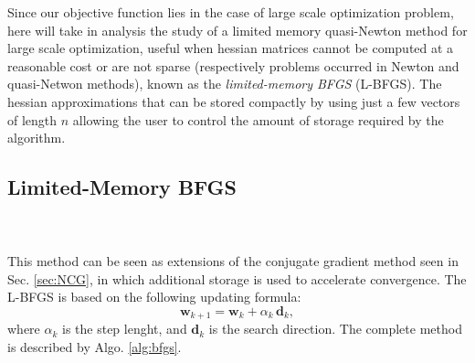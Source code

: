 Since our objective function lies in the case of large scale optimization problem, here will take in analysis the study of a limited memory quasi-Newton method for large scale optimization, useful when hessian matrices cannot be computed at a reasonable cost or are not sparse (respectively problems occurred in Newton and quasi-Netwon methods), known as the \emph{limited-memory BFGS} (L-BFGS). The hessian approximations that can be stored compactly by using just a few vectors of length $n$ allowing the user to control the amount of storage required by the algorithm. 
\newline{}\\
\subsection{Limited-Memory BFGS}
\\
\\
This method can be seen as extensions of the conjugate gradient method seen in Sec. \ref{sec:NCG}, in which additional storage is used to accelerate convergence. The L-BFGS is based on the following updating formula:
\begin{equation}
    \mathbf{w}_{k+1}=\mathbf{w}_k + \alpha_k \, \mathbf{d}_k,
    \label{eq:bfgs_update}
\end{equation}
where $\alpha_k$ is the step lenght, and $\mathbf{d}_k$ is the search direction. The complete method is described by Algo. \ref{alg:bfgs}.

